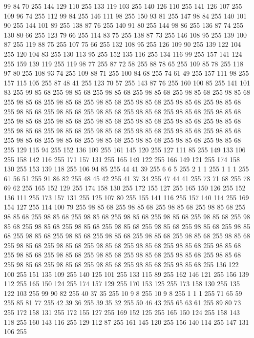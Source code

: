 99 84 70 255 144 129 110 255 133 119 103 255 140 126 110 255 141 126 107 255 109 96 74 255 112 99 84 255 146 111 98 255 150 93 81 255 147 98 84 255 140 101 90 255 144 101 89 255 138 87 76 255 140 91 80 255 144 98 86 255 136 87 74 255 130 80 66 255 123 79 66 255 114 83 75 255 138 87 73 255 146 108 95 255 139 100 87 255 119 88 75 255 107 75 66 255 132 108 95 255 126 109 90 255 139 122 104 255 120 104 83 255 130 113 95 255 152 135 116 255 134 116 99 255 157 141 124 255 159 139 119 255 119 98 77 255 87 72 58 255 88 78 65 255 109 85 78 255 118 97 80 255 108 93 74 255 109 88 71 255 100 84 68 255 74 61 49 255 157 111 98 255 157 115 105 255 87 48 41 255 123 70 57 255 143 87 76 255 160 100 85 255 141 101 83 255 99 85 68 255 98 85 68 255 98 85 68 255 98 85 68 255 98 85 68 255 98 85 68 255 98 85 68 255 98 85 68 255 98 85 68 255 98 85 68 255 98 85 68 255 98 85 68 255 98 85 68 255 98 85 68 255 98 85 68 255
98 85 68 255 98 85 68 255 98 85 68 255 98 85 68 255 98 85 68 255 98 85 68 255 98 85 68 255 98 85 68 255 98 85 68 255 98 85 68 255 98 85 68 255 98 85 68 255 98 85 68 255 98 85 68 255 98 85 68 255 98 85 68 255 98 85 68 255 98 85 68 255 98 85 68 255 98 85 68 255 98 85 68 255 129 115 94 255 152 136 109 255 161 145 120 255 127 111 85 255 149 133 106 255 158 142 116 255 171 157 131 255 165 149 122 255 166 149 121 255 174 158 130 255 153 139 118 255 106 94 85 255 44 41 39 255 6 6 5 255 2 1 1 255 1 1 1 255 61 56 51 255 91 86 82 255 48 45 42 255 41 37 34 255 47 44 41 255 73 71 68 255 78 69 62 255 165 152 129 255 174 158 130 255 172 155 127 255 165 150 126 255 152 136 111 255 173 157 131 255 125 107 80 255 155 141 116 255 157 140 114 255 169 154 127 255 114 100 79 255 98 85 68 255 98 85 68 255 98 85 68 255 98 85 68 255 98 85 68 255 98 85 68 255 98 85 68 255 98 85 68 255 98 85 68 255
98 85 68 255 98 85 68 255 98 85 68 255 98 85 68 255 98 85 68 255 98 85 68 255 98 85 68 255 98 85 68 255 98 85 68 255 98 85 68 255 98 85 68 255 98 85 68 255 98 85 68 255 98 85 68 255 98 85 68 255 98 85 68 255 98 85 68 255 98 85 68 255 98 85 68 255 98 85 68 255 98 85 68 255 98 85 68 255 98 85 68 255 98 85 68 255 98 85 68 255 98 85 68 255 98 85 68 255 98 85 68 255 98 85 68 255 98 85 68 255 98 85 68 255 136 122 100 255 151 135 109 255 140 125 101 255 133 115 89 255 162 146 121 255 156 139 112 255 165 150 124 255 174 157 129 255 170 153 125 255 173 158 130 255 135 122 103 255 99 90 82 255 40 37 35 255 10 9 8 255 10 9 8 255 1 1 1 255 71 65 59 255 85 81 77 255 42 39 36 255 39 35 32 255 50 46 43 255 65 63 61 255 89 80 73 255 172 158 131 255 172 155 127 255 169 152 125 255 165 150 124 255 158 143 118 255 160 143 116 255 129 112 87 255 161 145 120 255 156 140 114 255 147 131 106 255

